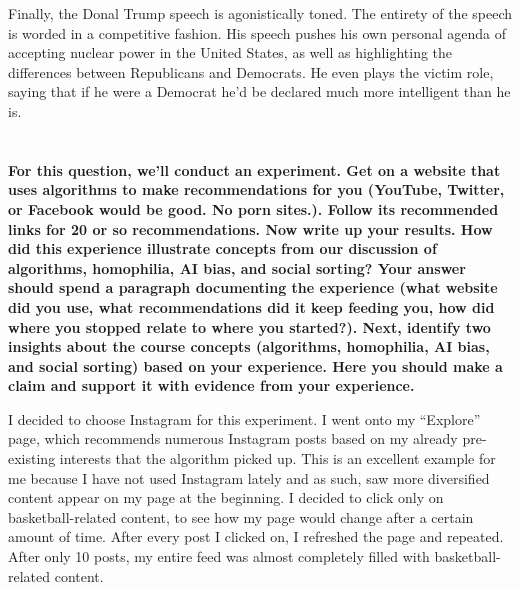 \documentclass[a4paper]{article}
\begin{document}
        Finally, the Donal Trump speech is agonistically toned. The entirety of the speech is worded in a competitive fashion. His speech pushes his own personal agenda of accepting nuclear power in the United States, as well as highlighting the differences between Republicans and Democrats. He even plays the victim role, saying that if he were a Democrat he’d be declared much more intelligent than he is. 


    \section{}
        \textbf{For this question, we’ll conduct an experiment. Get on a website that uses algorithms to make recommendations for you (YouTube, Twitter, or Facebook would be good. No porn sites.). Follow its recommended links for 20 or so recommendations. Now write up your results. How did this experience illustrate concepts from our discussion of algorithms, homophilia, AI bias, and social sorting? Your answer should spend a paragraph documenting the experience (what website did you use, what recommendations did it keep feeding you, how did where you stopped relate to where you started?). Next, identify two insights about the course concepts (algorithms, homophilia, AI bias, and social sorting) based on your experience. Here you should make a claim and support it with evidence from your experience.}
        
        I decided to choose Instagram for this experiment. I went onto my “Explore” page, which 
        recommends numerous Instagram posts based on my already pre-existing interests that the 
        algorithm picked up. This is an excellent example for me because I have not used Instagram 
        lately and as such, saw more diversified content appear on my page at the beginning. 
        I decided to click only on basketball-related content, to see how my page would change 
        after a certain amount of time. After every post I clicked on, I refreshed the page and 
        repeated. After only 10 posts, my entire feed was almost completely filled with 
        basketball-related content. 
\end{document}
